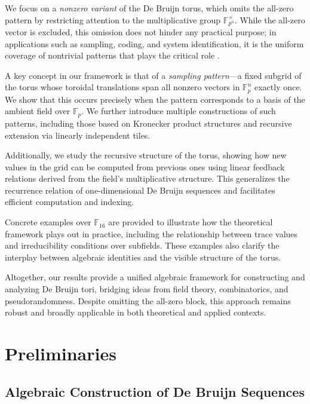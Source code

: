 \documentclass{article}
\begin{document}
We focus on a \emph{nonzero variant} of the De Bruijn torus, which omits the all-zero pattern by restricting attention to the multiplicative group \( \mathbb{F}_{p^n}^\times \). While the all-zero vector is excluded, this omission does not hinder any practical purpose; in applications such as sampling, coding, and system identification, it is the uniform coverage of nontrivial patterns that plays the critical role \cite{etzion2008optimality}.

A key concept in our framework is that of a \emph{sampling pattern}—a fixed subgrid of the torus whose toroidal translations span all nonzero vectors in \( \mathbb{F}_p^n \) exactly once. We show that this occurs precisely when the pattern corresponds to a basis of the ambient field over \( \mathbb{F}_p \). We further introduce multiple constructions of such patterns, including those based on Kronecker product structures and recursive extension via linearly independent tiles.

Additionally, we study the recursive structure of the torus, showing how new values in the grid can be computed from previous ones using linear feedback relations derived from the field's multiplicative structure. This generalizes the recurrence relation of one-dimensional De Bruijn sequences and facilitates efficient computation and indexing.

Concrete examples over \( \mathbb{F}_{16} \) are provided to illustrate how the theoretical framework plays out in practice, including the relationship between trace values and irreducibility conditions over subfields. These examples also clarify the interplay between algebraic identities and the visible structure of the torus.

Altogether, our results provide a unified algebraic framework for constructing and analyzing De Bruijn tori, bridging ideas from field theory, combinatorics, and pseudorandomness. Despite omitting the all-zero block, this approach remains robust and broadly applicable in both theoretical and applied contexts.


\section{ Preliminaries}

\subsection{Algebraic Construction of De Bruijn Sequences}
\end{document}
